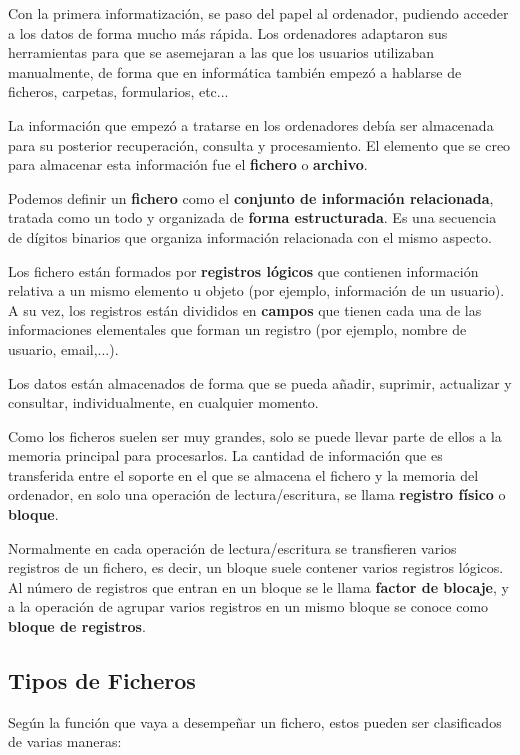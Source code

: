 Con la primera informatización, se paso del papel al ordenador, pudiendo acceder a los datos de forma mucho más rápida. Los ordenadores adaptaron sus herramientas para que se asemejaran a las que los usuarios utilizaban manualmente, de forma que en informática también empezó a hablarse de ficheros, carpetas, formularios, etc...

La información que empezó a tratarse en los ordenadores debía ser almacenada para su posterior recuperación, consulta y procesamiento. El elemento que se creo para almacenar esta información fue el \textbf{fichero} o \textbf{archivo}.

Podemos definir un \textbf{fichero} como el \textbf{conjunto de información relacionada}, tratada como un todo y organizada de \textbf{forma estructurada}. Es una secuencia de  dígitos binarios que organiza información relacionada con el mismo aspecto.

Los fichero están formados por \textbf{registros lógicos} que contienen información relativa a un mismo elemento u objeto (por ejemplo, información de un usuario). A su vez, los registros están divididos en \textbf{campos} que tienen cada una de las informaciones elementales que forman un registro (por ejemplo, nombre de usuario, email,...).

Los datos están almacenados de forma que se pueda añadir, suprimir, actualizar y consultar, individualmente, en cualquier momento.

Como los ficheros suelen ser muy grandes, solo se puede llevar parte de ellos a la memoria principal para procesarlos. La cantidad de información que es transferida entre el soporte en el que se almacena el fichero y la memoria del ordenador, en solo una operación de lectura/escritura, se llama \textbf{registro físico} o  \textbf{bloque}.

Normalmente en cada operación de lectura/escritura se transfieren varios registros de un fichero, es decir, un bloque suele contener varios registros lógicos. Al número de registros que entran en un bloque se le llama \textbf{factor de blocaje}, y a la operación de agrupar varios registros en un mismo bloque se conoce como \textbf{bloque de registros}.

\subsection{Tipos de Ficheros}
Según la función que vaya a desempeñar un fichero, estos pueden ser clasificados de varias maneras:


